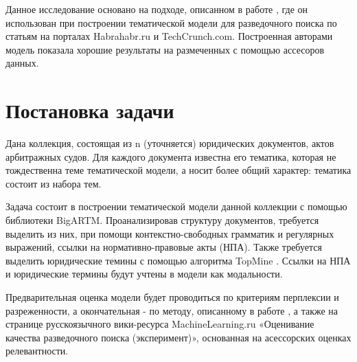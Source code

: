 \documentclass[12pt,twoside]{article}
\begin{document}





Данное исследование основано на подходе, описанном в работе \cite{Ianina_2017}, где он использован при построении тематической модели для разведочного поиска по статьям на порталах Habrahabr.ru и TechCrunch.com. Построенная авторами модель показала хорошие результаты на размеченных с помощью ассесоров данных.

\section{Постановка задачи}

Дана коллекция, состоящая из n (уточняется) юридических документов, актов арбитражных судов. Для каждого документа известна его тематика, которая не тождественна теме тематической модели, а носит более общий характер: тематика состоит из набора тем. 

Задача состоит в построении тематической модели данной коллекции с помощью библиотеки BigARTM. Проанализировав структуру документов, требуется выделить из них, при помощи контекстно-свободных грамматик и регулярных выражений, ссылки на нормативно-правовые акты (НПА). Также требуется выделить юридические темины с помощью алгоритма TopMine \cite{El-Kishky2014}. Ссылки на НПА и юридические термины будут учтены в модели как модальности.

Предварительная оценка модели будет проводиться по критериям перплексии и разреженности, а окончательная - по методу, описанному в работе \cite{Ianina_2017}, а также на странице русскоязычного вики-ресурса MachineLearning.ru «Оценивание качества разведочного поиска (эксперимент)», основанная на асессорских оценках релевантности.



\end{document}
